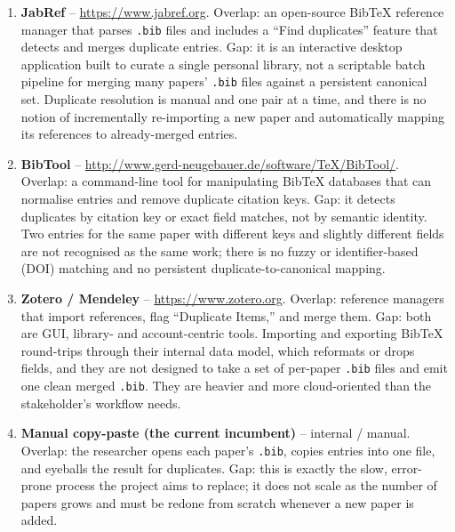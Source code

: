 \documentclass[11pt,a4paper]{article}
\begin{document}
\begin{enumerate}[leftmargin=*]
  \item \textbf{JabRef} -- \url{https://www.jabref.org}.
        Overlap: an open-source BibTeX reference manager that parses
        \texttt{.bib} files and includes a ``Find duplicates'' feature that
        detects and merges duplicate entries.
        Gap: it is an interactive desktop application built to curate a
        single personal library, not a scriptable batch pipeline for
        merging many papers' \texttt{.bib} files against a persistent
        canonical set. Duplicate resolution is manual and one pair at a
        time, and there is no notion of incrementally re-importing a new
        paper and automatically mapping its references to already-merged
        entries.
  \item \textbf{BibTool} --
        \url{http://www.gerd-neugebauer.de/software/TeX/BibTool/}.
        Overlap: a command-line tool for manipulating BibTeX databases that
        can normalise entries and remove duplicate citation keys.
        Gap: it detects duplicates by citation key or exact field matches,
        not by semantic identity. Two entries for the same paper with
        different keys and slightly different fields are not recognised as
        the same work; there is no fuzzy or identifier-based (DOI) matching
        and no persistent duplicate-to-canonical mapping.
  \item \textbf{Zotero / Mendeley} -- \url{https://www.zotero.org}.
        Overlap: reference managers that import references, flag
        ``Duplicate Items,'' and merge them.
        Gap: both are GUI, library- and account-centric tools. Importing
        and exporting BibTeX round-trips through their internal data model,
        which reformats or drops fields, and they are not designed to take
        a set of per-paper \texttt{.bib} files and emit one clean merged
        \texttt{.bib}. They are heavier and more cloud-oriented than the
        stakeholder's workflow needs.
  \item \textbf{Manual copy-paste (the current incumbent)} -- internal /
        manual.
        Overlap: the researcher opens each paper's \texttt{.bib}, copies
        entries into one file, and eyeballs the result for duplicates.
        Gap: this is exactly the slow, error-prone process the project
        aims to replace; it does not scale as the number of papers grows
        and must be redone from scratch whenever a new paper is added.
\end{enumerate}
\end{document}
